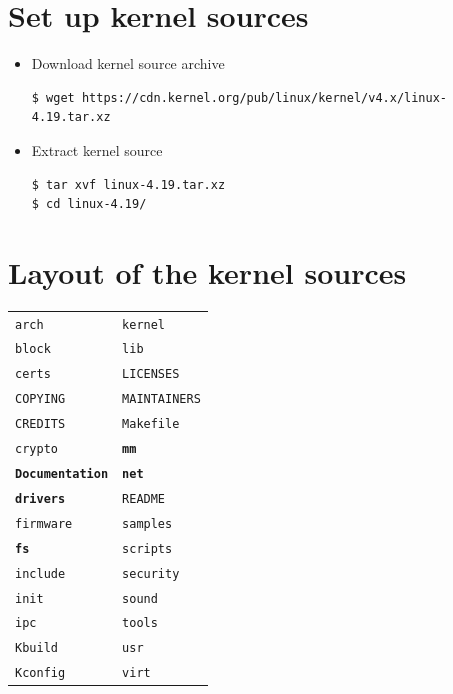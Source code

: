 \documentclass{beamer}
\begin{document}
\section{Set up kernel sources}
\label{sec:set-up-kernel-1}

\begin{frame}[fragile]
  \begin{itemize}
  \item Download kernel source archive
    \begin{lstlisting}
$ wget https://cdn.kernel.org/pub/linux/kernel/v4.x/linux-4.19.tar.xz
    \end{lstlisting}

  \item Extract kernel source
    \begin{lstlisting}
$ tar xvf linux-4.19.tar.xz 
$ cd linux-4.19/
    \end{lstlisting}
  \end{itemize}
\end{frame}

\section{Layout of the kernel sources}
\label{sec:layout-kernel-source}

\begin{frame}[fragile]
  \begin{tabular}{ll}
    \texttt{arch} & \texttt{kernel} \\
    \texttt{block} & \texttt{lib} \\
    \texttt{certs} & \texttt{LICENSES} \\
    \texttt{COPYING} & \texttt{MAINTAINERS} \\
    \texttt{CREDITS} & \texttt{Makefile} \\
    \texttt{crypto} & \textbf{\texttt{mm}} \\
    \textbf{\texttt{Documentation}} & \textbf{\texttt{net}} \\
    \textbf{\texttt{drivers}} & \texttt{README} \\
    \texttt{firmware} & \texttt{samples} \\
    \textbf{\texttt{fs}} & \texttt{scripts} \\
    \texttt{include} & \texttt{security} \\
    \texttt{init} & \texttt{sound} \\
    \texttt{ipc} & \texttt{tools} \\
    \texttt{Kbuild} & \texttt{usr} \\
    \texttt{Kconfig} & \texttt{virt} \\
  \end{tabular}
\end{frame}
\end{document}
